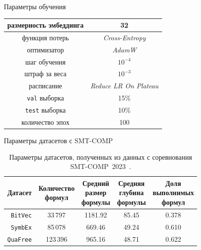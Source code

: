 \documentclass[14pt,aspectratio=169,hyperref={pdftex,unicode},xcolor=dvipsnames]{beamer}
\begin{document}
\begin{frame}[noframenumbering]{Параметры обучения}

\begin{table}[ht]
\begin{center}
\begin{tabular}{cc}
  \hline
  размерность эмбеддинга & 32 \\
  \hline
  функция потерь         & \textit{Cross-Entropy} \\
  оптимизатор            & \textit{AdamW} \\
  шаг обучения           & $10^{-4}$ \\
  штраф за веса          & $10^{-3}$ \\
  расписание             & \textit{Reduce LR On Plateau} \\
  \hline
  \texttt{val} выборка   & 15\% \\
  \texttt{test} выборка  & 10\% \\
  количество эпох        & 100
\end{tabular}
\end{center}
\end{table}

\end{frame}



\begin{frame}[noframenumbering]{Параметры датасетов с SMT-COMP}

\begin{table}[ht]
\begin{center}
\begin{tabular}{r|cccc}
  Датасет & \makecell{Количество \\ формул} & \makecell{Средний \\ размер \\ формулы} & \makecell{Средняя \\ глубина \\ формулы} & \makecell{Доля \\ выполнимых \\ формул} \\
  \hline \hline
  \rule{0pt}{2.5ex}
  \texttt{BitVec}  &  33\,797 & 1181.92 & 85.45 & 0.378 \\
  \texttt{SymbEx}  &  85\,078 &  669.46 & 49.24 & 0.610 \\
  \texttt{QuaFree} & 123\,396 &  965.16 & 48.71 & 0.622 \\
\end{tabular}
\caption{Параметры датасетов, полученных из данных с соревнования SMT-COMP~2023~\cite{smt-comp-2023-benchmarks}.}
\end{center}
\end{table}

\end{frame}
\end{document}
